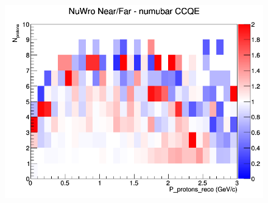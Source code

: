 \begin{figure}[h]
\endminipage
{}
\includegraphics[width=\linewidth]{eff_N_P/LAr/protons/ratios/CCQE_NuWro_numubar_NF_N_P.png}
\endminipage
\newline
\end{figure}
\clearpage
